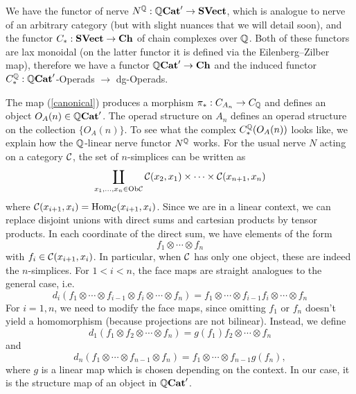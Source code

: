 \documentclass[TFM.tex]{subfiles}
\begin{document}
 We have the functor of nerve
$N^{\mathbb{Q}}: \mathbb{Q}\mathrm{\mathbf{Cat}}'\to \mathrm{\mathbf{SVect}}$, which is analogue to nerve of an arbitrary
category (but with slight nuances that we will detail soon), and the functor $C_*: \mathrm{\mathbf{SVect}} \to\mathrm{\mathbf{Ch}}$ of chain complexes over $\mathbb{Q}$. Both of these functors are lax monoidal (on the latter functor it is defined via the Eilenberg–Zilber map), therefore we have a functor $\mathbb{Q}\mathrm{\mathbf{Cat}}'\to\mathrm{\mathbf{Ch}}$ and the induced functor $C_*^{\mathbb{Q}}:\mathbb{Q}\mathrm{\mathbf{Cat}}'$-Operads $\to$ dg-Operads. 

The map (\ref{canonical}) produces a morphism $\pi_*: C_{A_n}\to C_{\mathbb{Q}}$ and defines an object
$O_A(n)\in \mathbb{Q}\mathrm{\mathbf{Cat}}'$. The operad structure on $A_n$ defines an operad structure on the
collection $\{O_A(n)\}$. 
To see what the complex $C_*^{\mathbb{Q}}(O_A(n))$ looks like, we explain how the $\mathbb{Q}$-linear nerve functor $N^{\mathbb{Q}}$ works. For the usual nerve $N$ acting on a category $\mathcal{C}$, the set of $n$-simplices can be written as
\[
\coprod_{x_1,\dots, x_n\in\mathrm{Ob}\mathcal{C}}\mathcal{C}(x_2,x_1)\times\cdots \times\mathcal{C}(x_{n+1},x_{n})
\]
where $\mathcal{C}(x_{i+1},x_i)=\operatorname{Hom}_{\mathcal{C}}(x_{i+1},x_i)$. Since we are in a linear context, we can replace disjoint unions with direct sums and cartesian products by tensor products. In each coordinate of the direct sum, we have elements of the form
\[
f_1\otimes\cdots \otimes f_{n}
\]
with $f_i\in \mathcal{C}(x_{i+1},x_i)$. In particular, when $\mathcal{C}$ has only one object, these are indeed the $n$-simplices. For $1<i<n$, the face maps are straight analogues to the general case, i.e. $$d_i(f_1\otimes\cdots \otimes f_{i-1}\otimes f_i\otimes \cdots\otimes f_n)=f_1\otimes\cdots \otimes f_{i-1}f_i\otimes\cdots \otimes f_n$$
For $i=1,n$, we need to modify the face maps, since omitting $f_1$ or $f_n$ doesn't yield a homomorphism (because projections are not bilinear). Instead, we define
\[
d_1(f_1\otimes f_2\otimes\cdots\otimes f_n)=g(f_1)f_2\otimes\cdots\otimes f_n
\]
and
\[
d_n(f_1\otimes\cdots\otimes f_{n-1}\otimes f_n)=f_1\otimes\cdots\otimes f_{n-1} g(f_n),
\]
where $g$ is a linear map which is chosen depending on the context. In our case, it is the structure map of an object in $\mathbb{Q}\mathrm{\mathbf{Cat}}'$.%
\end{document}
